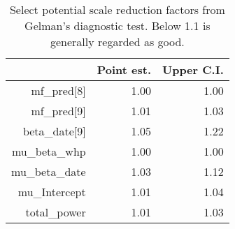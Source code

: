 \begin{table}[]
\centering
\begin{tabular}{rrr}
  \hline
 & Point est. & Upper C.I. \\ 
  \hline
mf\_pred[8] & 1.00 & 1.00 \\ 
  mf\_pred[9] & 1.01 & 1.03 \\ 
  beta\_date[9] & 1.05 & 1.22 \\ 
  mu\_beta\_whp & 1.00 & 1.00 \\ 
  mu\_beta\_date & 1.03 & 1.12 \\ 
  mu\_Intercept & 1.01 & 1.04 \\ 
  total\_power & 1.01 & 1.03 \\ 
   \hline
\end{tabular}
\caption{Select potential scale reduction factors from Gelman's diagnostic test. Below 1.1 is generally regarded as good.} 
\label{tab:gelman}
\end{table}
